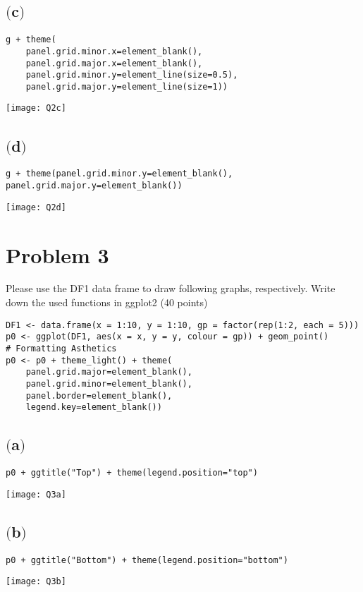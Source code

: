 \documentclass[a4paper,man,natbib]{apa6}
\begin{document}
\pagebreak

\subsection{$($c$)$}
\begin{verbatim}
g + theme(
	panel.grid.minor.x=element_blank(), 
	panel.grid.major.x=element_blank(), 
	panel.grid.minor.y=element_line(size=0.5), 
	panel.grid.major.y=element_line(size=1))
\end{verbatim}
\texttt{[image: Q2c]}

\subsection{$($d$)$}
\begin{verbatim}
g + theme(panel.grid.minor.y=element_blank(), panel.grid.major.y=element_blank())
\end{verbatim}
\texttt{[image: Q2d]}

\pagebreak

\section{Problem 3}
Please use the DF1 data frame to draw following graphs, respectively.  Write down the used functions in ggplot2 (40 points)
\begin{verbatim}
DF1 <- data.frame(x = 1:10, y = 1:10, gp = factor(rep(1:2, each = 5)))
p0 <- ggplot(DF1, aes(x = x, y = y, colour = gp)) + geom_point()
# Formatting Asthetics
p0 <- p0 + theme_light() + theme(
	panel.grid.major=element_blank(), 
	panel.grid.minor=element_blank(), 
	panel.border=element_blank(), 
	legend.key=element_blank())
\end{verbatim}

\subsection{$($a$)$}
\begin{verbatim}
p0 + ggtitle("Top") + theme(legend.position="top")
\end{verbatim}
\texttt{[image: Q3a]}

\subsection{$($b$)$}
\begin{verbatim}
p0 + ggtitle("Bottom") + theme(legend.position="bottom")
\end{verbatim}
\texttt{[image: Q3b]}
\end{document}
